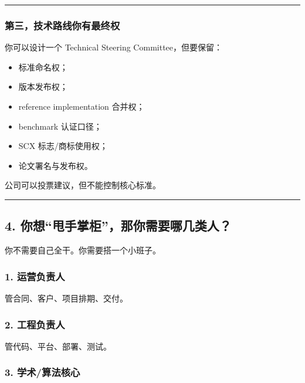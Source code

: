 \documentclass[
  12pt,
]{ctexart}
\providecommand{\tightlist}{%
  \setlength{\itemsep}{0pt}\setlength{\parskip}{0pt}}
\begin{document}
\begin{center}\rule{0.5\linewidth}{0.5pt}\end{center}

\subsubsection{第三，技术路线你有最终权}\label{ux7b2cux4e09ux6280ux672fux8defux7ebfux4f60ux6709ux6700ux7ec8ux6743}

你可以设计一个 Technical Steering Committee，但要保留：

\begin{itemize}
\tightlist
\item
  标准命名权；
\item
  版本发布权；
\item
  reference implementation 合并权；
\item
  benchmark 认证口径；
\item
  SCX 标志/商标使用权；
\item
  论文署名与发布权。
\end{itemize}

公司可以投票建议，但不能控制核心标准。

\begin{center}\rule{0.5\linewidth}{0.5pt}\end{center}

\subsection{4.
你想``甩手掌柜''，那你需要哪几类人？}\label{ux4f60ux60f3ux7529ux624bux638cux67dcux90a3ux4f60ux9700ux8981ux54eaux51e0ux7c7bux4eba}

你不需要自己全干。你需要搭一个小班子。

\subsubsection{1. 运营负责人}\label{ux8fd0ux8425ux8d1fux8d23ux4eba}

管合同、客户、项目排期、交付。

\subsubsection{2. 工程负责人}\label{ux5de5ux7a0bux8d1fux8d23ux4eba}

管代码、平台、部署、测试。

\subsubsection{3.
学术/算法核心}\label{ux5b66ux672fux7b97ux6cd5ux6838ux5fc3}
\end{document}
